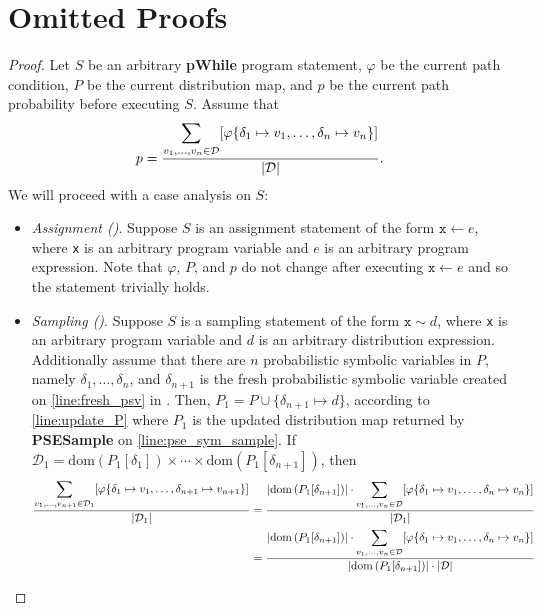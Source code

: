 \documentclass[acmsmall,review,anonymous]{acmart}\settopmatter{printfolios=true,printccs=false,printacmref=false}
\DeclarePairedDelimiter{\abs}{\lvert}{\rvert}
\newcommand*\dom[1]{\mathrm{dom}\left( #1 \right)}
\begin{document}
\section{Omitted Proofs}
\label{sec:omitted_proofs}
\equivpthm*
\begin{proof}
  Let $S$ be an arbitrary \textbf{pWhile} program statement, $\varphi$ be the current path condition, $P$ be the current distribution map, and $p$ be the current path probability before executing $S$.
  Assume that
  \[
    p = \frac{\displaystyle\sum_{v_1,\ldots,v_n \in \mathcal{D}} [ \varphi\{\delta_1 \mapsto v_1, \ldots, \delta_n \mapsto v_n\} ]}{\abs{\mathcal{D}}}.
  \]
  We will proceed with a case analysis on $S$:
  \begin{itemize}
  \item \textit{Assignment ()}. Suppose $S$ is an assignment statement of the form $\mathtt{x} \gets e$, where \texttt{x} is an arbitrary program variable and $e$ is an arbitrary program expression.
    Note that $\varphi$, $P$, and $p$ do not change after executing $\mathtt{x} \gets e$ and so the statement trivially holds.
  \item \textit{Sampling ()}. Suppose $S$ is a sampling statement of the form $\mathtt{x} \sim d$, where \texttt{x} is an arbitrary program variable and $d$ is an arbitrary distribution expression.
    Additionally assume that there are $n$ probabilistic symbolic variables in $P$, namely $\delta_1,\ldots,\delta_n$, and $\delta_{n+1}$ is the fresh probabilistic symbolic variable created on \cref{line:fresh_psv} in .
    Then, $P_1 = P \cup \{\delta_{n+1} \mapsto d\}$, according to \cref{line:update_P} where $P_1$ is the updated distribution map returned by \textbf{PSESample} on \cref{line:pse_sym_sample}.
    If $\mathcal{D}_1 = \dom{P_1[\delta_1]} \times \cdots \times \dom{P_1[\delta_{n+1}]}$, then
    \begin{align*}
      \frac{\displaystyle\sum_{v_1,\ldots,v_{n+1} \in \mathcal{D}_1} [ \varphi\{\delta_1 \mapsto v_1, \ldots, \delta_{n+1} \mapsto v_{n+1}\}]}{\abs{\mathcal{D}_1}} &= \frac{\abs{\dom{P_1[\delta_{n+1}]}} \cdot \displaystyle\sum_{v_1,\ldots,v_{n} \in \mathcal{D}} [ \varphi\{\delta_1 \mapsto v_1, \ldots, \delta_{n} \mapsto v_{n}\}]}{\abs{\mathcal{D}_1}} \\
                                                                                                                         &= \frac{\abs{\dom{P_1[\delta_{n+1}]}} \cdot \displaystyle\sum_{v_1,\ldots,v_{n} \in \mathcal{D}} [ \varphi\{\delta_1 \mapsto v_1, \ldots, \delta_{n} \mapsto v_{n}\}]}{\abs{\dom{P_1[\delta_{n+1}]}} \cdot \abs{\mathcal{D}}} \\

\end{align*}
\end{itemize}
\end{proof}
\end{document}
